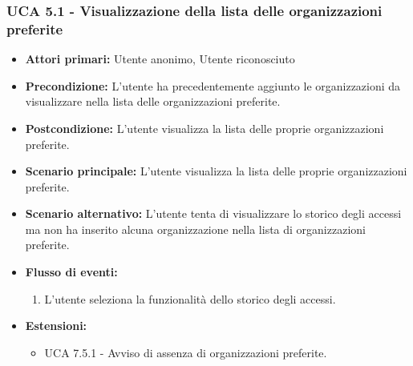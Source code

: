 \subsubsection{UCA 5.1 - Visualizzazione della lista delle organizzazioni preferite}
\begin{itemize}
    \item \textbf{Attori primari:} Utente anonimo, Utente riconosciuto
    \item \textbf{Precondizione:} L'utente ha precedentemente aggiunto le organizzazioni da visualizzare nella lista delle organizzazioni preferite.
    \item \textbf{Postcondizione:} L'utente visualizza la lista delle proprie organizzazioni preferite.
    \item \textbf{Scenario principale:} L'utente visualizza la lista delle proprie organizzazioni preferite.
    \item \textbf{Scenario alternativo:} L'utente tenta di visualizzare lo storico degli accessi ma non ha inserito alcuna organizzazione nella lista di organizzazioni preferite.
    \item \textbf{Flusso di eventi:}
    \begin{enumerate}
        \item L'utente seleziona la funzionalità dello storico degli accessi.
    \end{enumerate}
    \item \textbf{Estensioni:}
    \begin{itemize}
        \item UCA 7.5.1 - Avviso di assenza di organizzazioni preferite.
    \end{itemize}
\end{itemize}

